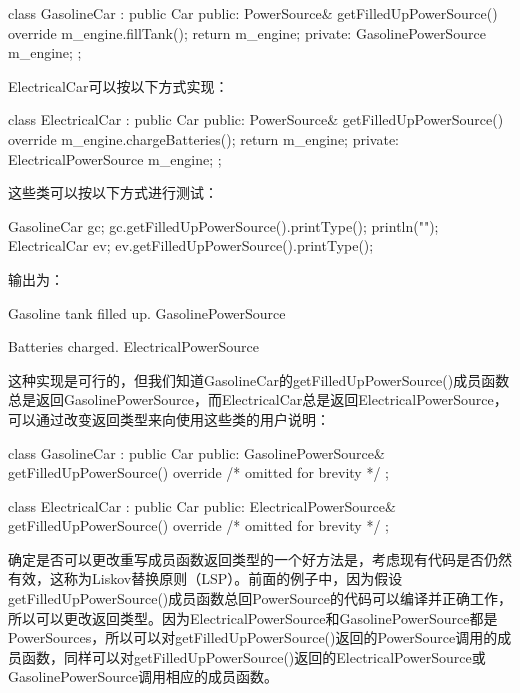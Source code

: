 \begin{cpp}
class GasolineCar : public Car
{
    public:
        PowerSource& getFilledUpPowerSource() override
        {
            m_engine.fillTank();
            return m_engine;
        }
    private:
        GasolinePowerSource m_engine;
};
\end{cpp}

ElectricalCar可以按以下方式实现：

\begin{cpp}
class ElectricalCar : public Car
{
    public:
        PowerSource& getFilledUpPowerSource() override
        {
            m_engine.chargeBatteries();
            return m_engine;
        }
    private:
        ElectricalPowerSource m_engine;
};
\end{cpp}

这些类可以按以下方式进行测试：

\begin{cpp}
GasolineCar gc;
gc.getFilledUpPowerSource().printType();
println("");
ElectricalCar ev;
ev.getFilledUpPowerSource().printType();
\end{cpp}

输出为：

\begin{shell}
Gasoline tank filled up.
GasolinePowerSource

Batteries charged.
ElectricalPowerSource
\end{shell}

这种实现是可行的，但我们知道GasolineCar的getFilledUpPowerSource()成员函数总是返回GasolinePowerSource，而ElectricalCar总是返回ElectricalPowerSource，可以通过改变返回类型来向使用这些类的用户说明：

\begin{cpp}
class GasolineCar : public Car
{
    public:
    GasolinePowerSource& getFilledUpPowerSource() override
    { /* omitted for brevity */ }
};

class ElectricalCar : public Car
{
    public:
    ElectricalPowerSource& getFilledUpPowerSource() override
    { /* omitted for brevity */ }
};
\end{cpp}

确定是否可以更改重写成员函数返回类型的一个好方法是，考虑现有代码是否仍然有效，这称为Liskov替换原则（LSP）。前面的例子中，因为假设getFilledUpPowerSource()成员函数总回PowerSource的代码可以编译并正确工作，所以可以更改返回类型。因为ElectricalPowerSource和GasolinePowerSource都是PowerSources，所以可以对getFilledUpPowerSource()返回的PowerSource调用的成员函数，同样可以对getFilledUpPowerSource()返回的ElectricalPowerSource或GasolinePowerSource调用相应的成员函数。

